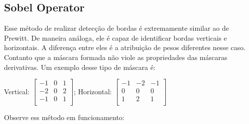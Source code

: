 \documentclass[a4paper, 12pt]{article}
\begin{document}
\subsection{Sobel Operator}
Esse método de realizar detecção de bordas é extremamente similar ao de Prewitt. De maneira análoga, ele é capaz de identificar bordas verticais e horizontais. 
A diferença entre eles é a atribuição de pesos diferentes nesse caso. Contanto que a máscara formada não viole as propriedades das máscaras derivativas.
Um exemplo desse tipo de máscara é:
\\
\begin{center}
	Vertical:
	$
	\begin{bmatrix}
		-1 & 0 & 1 \\
		-2 & 0 & 2 \\
		-1 & 0 & 1 \\
	\end{bmatrix}
	$;
	Horizontal:
	$
	\begin{bmatrix}
	   -1 & -2  & -1 \\
		0 &  0  &  0 \\
		1 &  2  &  1 \\
	\end{bmatrix}
	$
\end{center}
Observe ess método em funcionamento:
\end{document}
